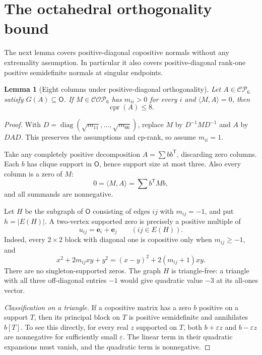 \documentclass[11pt,a4paper]{article}
\newtheorem{lemma}[theorem]{Lemma}
\theoremstyle{definition}
\newcommand{\CP}{\mathcal{CP}}
\newcommand{\COP}{\mathcal{COP}}
\newcommand{\OO}{\mathsf{O}}
\DeclareMathOperator{\cpr}{cpr}
\DeclareMathOperator{\diag}{diag}
\newcommand{\ip}[2]{\langle #1,#2\rangle}
\newcommand{\ee}{\mathbf e}
\newcommand{\T}{\mathsf T}
\begin{document}
\section{The octahedral orthogonality bound}

The next lemma covers positive-diagonal copositive normals without any extremality assumption. In particular it also covers positive-diagonal rank-one positive semidefinite normals at singular endpoints.

\begin{lemma}[Eight columns under positive-diagonal orthogonality]\label{lem:octanormal}
Let $A\in\CP_6$ satisfy $G(A)\subseteq\OO$. If $M\in\COP_6$ has $m_{ii}>0$ for every $i$ and $\ip{M}{A}=0$, then
\[
 \cpr(A)\leq8.
\]
\end{lemma}
\begin{proof}
With $D=\diag(\sqrt{m_{11}},\ldots,\sqrt{m_{66}})$, replace $M$ by $D^{-1}MD^{-1}$ and $A$ by $DAD$. This preserves the assumptions and cp-rank, so assume $m_{ii}=1$.

Take any completely positive decomposition $A=\sum b b^{\T}$, discarding zero columns. Each $b$ has clique support in $\OO$, hence support size at most three. Also every column is a zero of $M$:
\[
 0=\ip{M}{A}=\sum b^{\T}Mb,
\]
and all summands are nonnegative.

Let $H$ be the subgraph of $\OO$ consisting of edges $ij$ with $m_{ij}=-1$, and put $h=|E(H)|$. A two-vertex supported zero is precisely a positive multiple of
\[
 u_{ij}=\ee_i+\ee_j\qquad(ij\in E(H)).
\]
Indeed, every $2\times2$ block with diagonal one is copositive only when $m_{ij}\geq-1$, and
\[
 x^2+2m_{ij}xy+y^2=(x-y)^2+2(m_{ij}+1)xy.
\]
There are no singleton-supported zeros. The graph $H$ is triangle-free: a triangle with all three off-diagonal entries $-1$ would give quadratic value $-3$ at its all-ones vector.

\medskip\noindent\emph{Classification on a triangle.}
If a copositive matrix has a zero $b$ positive on a support $T$, then its principal block on $T$ is positive semidefinite and annihilates $b[T]$. To see this directly, for every real $z$ supported on $T$, both $b+\varepsilon z$ and $b-\varepsilon z$ are nonnegative for sufficiently small $\varepsilon$. The linear term in their quadratic expansions must vanish, and the quadratic term is nonnegative.


\end{proof}
\end{document}
